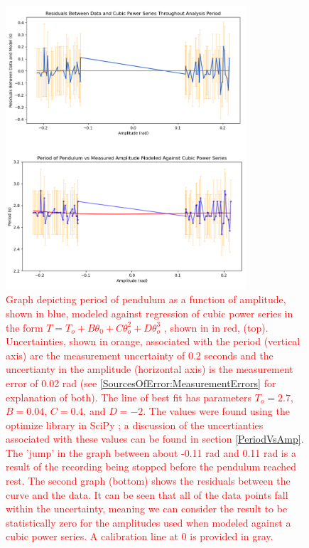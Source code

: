 \documentclass[11pt]{article}
\begin{document}
        \begin{figure}[H]
            \centering\includegraphics[width = 0.8\textwidth]{CubeGraph.PNG}
            \caption{\textcolor{red}{Graph depicting period of pendulum as a function of amplitude, shown in blue, modeled against regression of cubic power series in the form $T = T_{o} + B\theta_{0} + C\theta_{o}^{2} + D\theta_{o}^{3}$ \cite{labManual}, shown in in red, (top). Uncertainties, shown in orange, associated with the period (vertical axis) are the measurement uncertainty of 0.2 seconds and the uncertianty in the amplitude (horizontal axis) is the measurement error of 0.02 rad (see \ref{SourcesOfError:MeasurementErrors} for explanation of both). The line of best fit has parameters $T_o = 2.7$, $B = 0.04 $, $C = 0.4$, and $D = -2$. The values were found using the optimize library in SciPy \cite{2020SciPy-NMeth}; a discussion of the uncertianties associated with these values can be found in section \ref{PeriodVsAmp}. The 'jump' in the graph between about -0.11 rad and 0.11 rad is a result of the recording being stopped before the pendulum reached rest. The second graph (bottom) shows the residuals between the curve and the data. It can be seen that all of the data points fall within the uncertainty, meaning we can consider the result to be statistically zero for the amplitudes used when modeled against a cubic power series. A calibration line at 0 is provided in gray.}}   
            \label{fig:CubicPowerSeries}        
        \end{figure}
\end{document}
